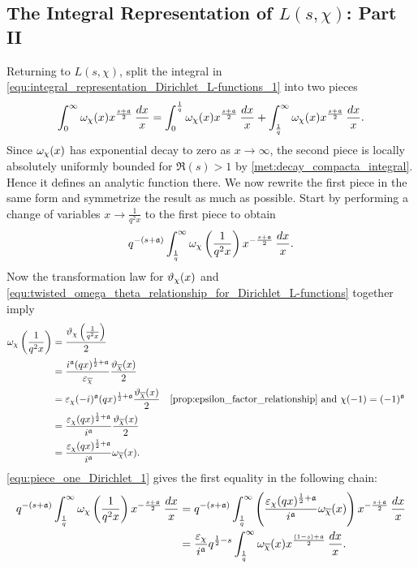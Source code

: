     \subsection*{The Integral Representation of \texorpdfstring{$L(s,\chi)$}{L(s,\chi)}: Part II}
      Returning to $L(s,\chi)$, split the integral in \cref{equ:integral_representation_Dirichlet_L-functions_1} into two pieces
      \begin{equation}\label{equ:symmetric_integral_Dirichlet_L-functions_split}
        \int_{0}^{\infty}\omega_{\chi}(x)x^{\frac{s+\mathfrak{a}}{2}}\,\frac{dx}{x} = \int_{0}^{\frac{1}{q}}\omega_{\chi}(x)x^{\frac{s+\mathfrak{a}}{2}}\,\frac{dx}{x}+\int_{\frac{1}{q}}^{\infty}\omega_{\chi}(x)x^{\frac{s+\mathfrak{a}}{2}}\,\frac{dx}{x}.
      \end{equation}
      Since $\omega_{\chi}(x)$ has exponential decay to zero as $x \to \infty$, the second piece is locally absolutely uniformly bounded for $\Re(s) > 1$ by \cref{met:decay_compacta_integral}. Hence it defines an analytic function there. We now rewrite the first piece in the same form and symmetrize the result as much as possible. Start by performing a change of variables $x \to \frac{1}{q^{2}x}$ to the first piece to obtain
      \[
        q^{-(s+\mathfrak{a})}\int_{\frac{1}{q}}^{\infty}\omega_{\chi}\left(\frac{1}{q^{2}x}\right)x^{-\frac{s+\mathfrak{a}}{2}}\,\frac{dx}{x}.
      \]
      Now the transformation law for $\vartheta_{\chi}(x)$ and \cref{equ:twisted_omega_theta_relationship_for_Dirichlet_L-functions} together imply
      \begin{equation}\label{equ:piece_one_Dirichlet_1}
        \begin{aligned}
          \w_{\chi}\left(\frac{1}{q^{2}x}\right) &= \frac{\vt_{\chi}\left(\frac{1}{q^{2}x}\right)}{2} \\
          &= \frac{i^{\mf{a}}(qx)^{\frac{1}{2}+\mf{a}}}{\e_{\cchi}}\frac{\vt_{\cchi}(x)}{2} \\
          &= \e_{\chi}(-i)^{\mf{a}}(qx)^{\frac{1}{2}+\mf{a}}\frac{\vt_{\cchi}(x)}{2} && \text{\cref{prop:epsilon_factor_relationship} and $\chi(-1) = (-1)^{\mf{a}}$} \\
          &= \frac{\e_{\chi}(qx)^{\frac{1}{2}+\mf{a}}}{i^{\mf{a}}}\frac{\vt_{\cchi}(x)}{2} \\
          &= \frac{\e_{\chi}(qx)^{\frac{1}{2}+\mf{a}}}{i^{\mf{a}}}\w_{\cchi}(x).
        \end{aligned}
      \end{equation}
      \cref{equ:piece_one_Dirichlet_1} gives the first equality in the following chain:
      \begin{align*}
        q^{-(s+\mathfrak{a})}\int_{\frac{1}{q}}^{\infty}\omega_{\chi}\left(\frac{1}{q^{2}x}\right)x^{-\frac{s+\mathfrak{a}}{2}}\,\frac{dx}{x} &= q^{-(s+\mathfrak{a})}\int_{\frac{1}{q}}^{\infty}\left(\frac{\varepsilon_{\chi}(qx)^{\frac{1}{2}+\mathfrak{a}}}{i^{\mathfrak{a}}}\omega_{\overline{\chi}}(x)\right)x^{-\frac{s+\mathfrak{a}}{2}}\,\frac{dx}{x} \\
        &= \frac{\varepsilon_{\chi}}{i^{\mathfrak{a}}}q^{\frac{1}{2}-s}\int_{\frac{1}{q}}^{\infty}\omega_{\overline{\chi}}(x)x^{\frac{(1-s)+\mathfrak{a}}{2}}\,\frac{dx}{x}.
      \end{align*}
